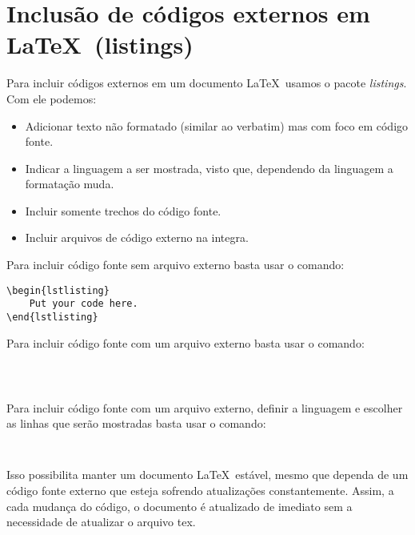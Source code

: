 \section[Inclusão de códigos externos em \LaTeX]{Inclusão de códigos externos em \LaTeX~(listings)}

\begin{frame}[fragile]
\begin{block}{}
Para incluir códigos externos em um documento \LaTeX~usamos o pacote {\it listings}. Com ele podemos:
\begin{itemize}
 \item Adicionar texto não formatado (similar ao verbatim) mas com foco em código fonte.
 \item Indicar a linguagem a ser mostrada, visto que, dependendo da linguagem a formatação muda.
 \item Incluir somente trechos do código fonte.
 \item Incluir arquivos de código externo na integra.
\end{itemize}
\end{block}
\end{frame}


\begin{frame}[fragile]

Para incluir código fonte sem arquivo externo basta usar o comando: 

\begin{verbatim}
\begin{lstlisting} 
    Put your code here. 
\end{lstlisting}
\end{verbatim}


\end{frame}


\begin{frame}[fragile]

Para incluir código fonte com um arquivo externo basta usar o comando: 

\begin{verbatim}
 


\end{verbatim}


\end{frame}

\begin{frame}[fragile]

Para incluir código fonte com um arquivo externo, definir a linguagem e escolher as linhas que serão mostradas basta usar o comando: 

\begin{verbatim} 


\end{verbatim}

Isso possibilita manter um documento \LaTeX~estável, mesmo que dependa de um código fonte externo que esteja sofrendo atualizações constantemente. Assim, a cada mudança do código, o documento é atualizado de imediato sem a necessidade de atualizar o arquivo {\ttfamily tex}.


\end{frame}


